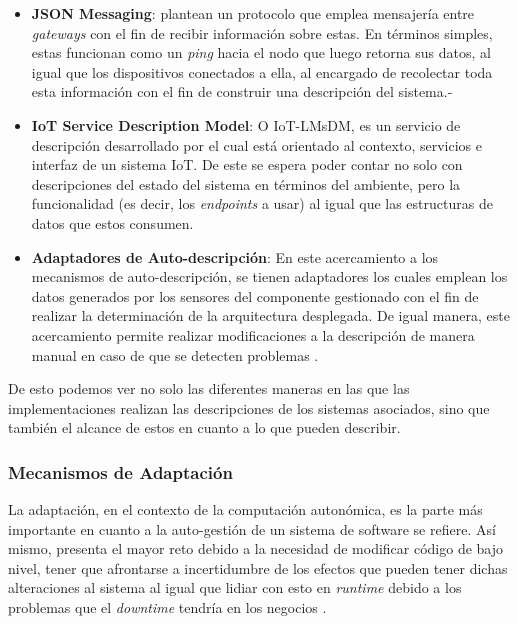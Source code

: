 \begin{itemize}
    \item \textbf{JSON Messaging}: \citeauthor{Iancu_2022} \citeyear{Iancu_2022} plantean un protocolo que emplea mensajería entre \textit{gateways} con el fin de recibir información sobre estas. En términos simples, estas funcionan como un \textit{ping} hacia el nodo que luego retorna sus datos, al igual que los dispositivos conectados a ella, al encargado de recolectar toda esta información con el fin de construir una descripción del sistema.-
    
    \item \textbf{IoT Service Description Model}: O IoT-LMsDM, es un servicio de descripción desarrollado por \citeauthor{Wang_2021} \citeyear{Wang_2021} el cual está orientado al contexto, servicios e interfaz de un sistema IoT. De este se espera poder contar no solo con descripciones del estado del sistema en términos del ambiente, pero la funcionalidad (es decir, los \textit{endpoints} a usar) al igual que las estructuras de datos que estos consumen.
    
    \item \textbf{Adaptadores de Auto-descripción}: En este acercamiento a los mecanismos de auto-descripción, se tienen adaptadores los cuales emplean los datos generados por los sensores del componente gestionado con el fin de realizar la determinación de la arquitectura desplegada. De igual manera, este acercamiento permite realizar modificaciones a la descripción de manera manual en caso de que se detecten problemas \cite{msc_henry_2022}.

\end{itemize}

De esto podemos ver no solo las diferentes maneras en las que las implementaciones realizan las descripciones de los sistemas asociados, sino que también el alcance de estos en cuanto a lo que pueden describir.

\subsubsection{Mecanismos de Adaptación} \label{sec:MecAdap}


La adaptación, en el contexto de la computación autonómica, es la parte más importante en cuanto a la auto-gestión de un sistema de software se refiere. Así mismo, presenta el mayor reto debido a la necesidad de modificar código de bajo nivel, tener que afrontarse a incertidumbre de los efectos que pueden tener dichas alteraciones al sistema al igual que lidiar con esto en \textit{runtime} debido a los problemas que el \textit{downtime} tendría en los negocios \cite{lalanda_diaconescu_mccann_2014}. 

